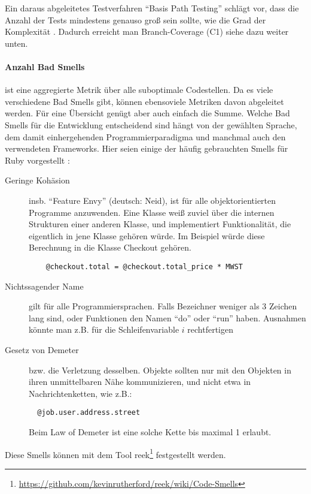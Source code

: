 Ein daraus abgeleitetes Testverfahren "`Basis Path Testing"' schlägt vor, dass die Anzahl der Tests mindestens genauso groß sein sollte, wie die Grad der Komplexität \citep[S. 318]{mccabe_complexity_1976}. Dadurch erreicht man Branch-Coverage (C1) siehe dazu weiter unten.



\paragraph{Anzahl Bad Smells} ist eine aggregierte Metrik über alle suboptimale Codestellen. Da es viele verschiedene Bad Smells gibt, können ebensoviele Metriken davon abgeleitet werden. Für eine Übersicht genügt aber auch einfach die Summe. Welche Bad Smells für die Entwicklung entscheidend sind hängt von der gewählten Sprache, dem damit einhergehenden Programmierparadigma und manchmal auch den verwendeten Frameworks. Hier seien einige der häufig gebrauchten Smells für Ruby vorgestellt \citep{kevin_rutherford_code_2010}:

\begin{description}
 \item[Geringe Kohäsion] insb. "`Feature Envy"' (deutsch: Neid), ist für alle objektorientierten Programme anzuwenden. Eine Klasse weiß zuviel über die internen Strukturen einer anderen Klasse, und implementiert Funktionalität, die eigentlich in jene Klasse gehören würde. Im Beispiel würde diese Berechnung in die Klasse Checkout gehören.
 \begin{lstlisting}
    @checkout.total = @checkout.total_price * MWST
 \end{lstlisting}
 \item[Nichtssagender Name] gilt für alle Programmiersprachen. Falls Bezeichner weniger als 3 Zeichen lang sind, oder Funktionen den Namen "`do"' oder "`run"' haben. Ausnahmen könnte man z.B. für die Schleifenvariable $i$ rechtfertigen
 \item[Gesetz von Demeter] bzw. die Verletzung desselben. Objekte sollten nur mit den Objekten in ihren unmittelbaren Nähe kommunizieren, und nicht etwa in Nachrichtenketten, wie z.B.:
 \begin{lstlisting}
  @job.user.address.street
 \end{lstlisting}
 Beim Law of Demeter ist eine solche Kette bis maximal 1 erlaubt.

 \end{description}

Diese Smells können mit dem Tool reek\footnote{\url{https://github.com/kevinrutherford/reek/wiki/Code-Smells}} festgestellt werden.
